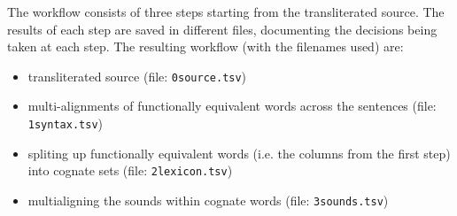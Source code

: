 \documentclass[11pt]{article}
\begin{document}
The workflow consists of three steps starting from the transliterated source. The results of each step are saved in different files, documenting the decisions being taken at each step. The resulting workflow (with the filenames used) are:

\begin{itemize}
  \item transliterated source (file: \texttt{0source.tsv})
  \item multi-alignments of functionally equivalent words across the sentences (file: \texttt{1syntax.tsv})
  \item spliting up functionally equivalent words (i.e. the columns from the first step) into cognate sets (file: \texttt{2lexicon.tsv})
  \item multialigning the sounds within cognate words (file: \texttt{3sounds.tsv})
\end{itemize}









\printbibliography
\end{document}
